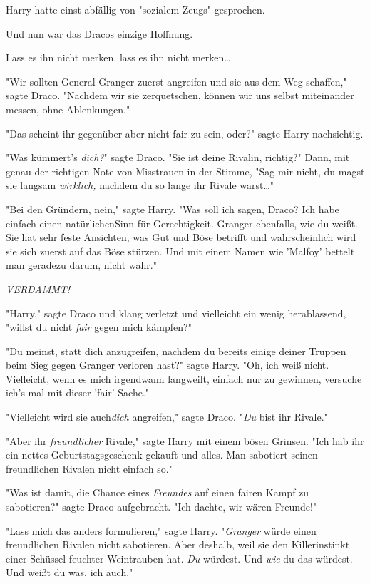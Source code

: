 {Harry hatte einst abfällig von "sozialem Zeugs" gesprochen.

Und nun war das Dracos einzige Hoffnung.

Lass es ihn nicht merken, lass es ihn nicht merken…

"Wir sollten General Granger zuerst angreifen und sie aus dem Weg schaffen," sagte Draco. "Nachdem wir sie zerquetschen, können wir uns selbst miteinander messen, ohne Ablenkungen."

"Das scheint ihr gegenüber aber nicht fair zu sein, oder?" sagte Harry nachsichtig.

"Was kümmert's \emph{dich?}" sagte Draco. "Sie ist deine Rivalin, richtig?" Dann, mit genau der richtigen Note von Misstrauen in der Stimme, "Sag mir nicht, du magst sie langsam \emph{wirklich,} nachdem du so lange ihr Rivale warst…"

"Bei den Gründern, nein," sagte Harry. "Was soll ich sagen, Draco? Ich habe einfach einen natürlichenSinn für Gerechtigkeit. Granger ebenfalls, wie du weißt. Sie hat sehr feste Ansichten, was Gut und Böse betrifft und wahrscheinlich wird sie sich zuerst auf das Böse stürzen. Und mit einem Namen wie 'Malfoy' bettelt man geradezu darum, nicht wahr."

\emph{VERDAMMT!}

"Harry," sagte Draco und klang verletzt und vielleicht ein wenig herablassend, "willst du nicht \emph{fair} gegen mich kämpfen?"

"Du meinst, statt dich anzugreifen, nachdem du bereits einige deiner Truppen beim Sieg gegen Granger verloren hast?" sagte Harry. "Oh, ich weiß nicht. Vielleicht, wenn es mich irgendwann langweilt, einfach nur zu gewinnen, versuche ich's mal mit dieser 'fair'-Sache."

"Vielleicht wird sie auch\emph{dich} angreifen," sagte Draco. "\emph{Du} bist ihr Rivale."

"Aber ihr \emph{freundlicher} Rivale," sagte Harry mit einem bösen Grinsen. "Ich hab ihr ein nettes Geburtstagsgeschenk gekauft und alles. Man sabotiert seinen freundlichen Rivalen nicht einfach so."

"Was ist damit, die Chance eines \emph{Freundes} auf einen fairen Kampf zu sabotieren?" sagte Draco aufgebracht. "Ich dachte, wir wären Freunde!"

"Lass mich das anders formulieren," sagte Harry. "\emph{Granger} würde einen freundlichen Rivalen nicht sabotieren. Aber deshalb, weil sie den Killerinstinkt einer Schüssel feuchter Weintrauben hat. \emph{Du} würdest. Und \emph{wie} du das würdest. Und weißt du was, ich auch."

}
